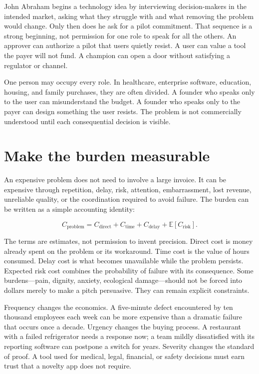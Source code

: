 John Abraham begins a technology idea by interviewing decision-makers in the
intended market, asking what they struggle with and what removing the problem
would change. Only then does he ask for a pilot commitment. That sequence is a
strong beginning, not permission for one role to speak for all the others. An
approver can authorize a pilot that users quietly resist. A user can value a
tool the payer will not fund. A champion can open a door without satisfying a
regulator or channel.

One person may occupy every role. In healthcare, enterprise software,
education, housing, and family purchases, they are often divided. A founder who
speaks only to the user can misunderstand the budget. A founder who speaks only
to the payer can design something the user resists. The problem is not
commercially understood until each consequential decision is visible.

\section{Make the burden measurable}

An expensive problem does not need to involve a large invoice. It can be
expensive through repetition, delay, risk, attention, embarrassment, lost
revenue, unreliable quality, or the coordination required to avoid failure.
The burden can be written as a simple accounting identity:

\begin{equation}
C_{\mathrm{problem}} = C_{\mathrm{direct}} + C_{\mathrm{time}}
  + C_{\mathrm{delay}} + \mathbb{E}[C_{\mathrm{risk}}].
\end{equation}

The terms are estimates, not permission to invent precision. Direct cost is
money already spent on the problem or its workaround. Time cost is the value of
hours consumed. Delay cost is what becomes unavailable while the problem
persists. Expected risk cost combines the probability of failure with its
consequence. Some burdens---pain, dignity, anxiety, ecological damage---should
not be forced into dollars merely to make a pitch persuasive. They can remain
explicit constraints.

Frequency changes the economics. A five-minute defect encountered by ten
thousand employees each week can be more expensive than a dramatic failure
that occurs once a decade. Urgency changes the buying process. A restaurant
with a failed refrigerator needs a response now; a team mildly dissatisfied
with its reporting software can postpone a switch for years. Severity changes
the standard of proof. A tool used for medical, legal, financial, or safety
decisions must earn trust that a novelty app does not require.

